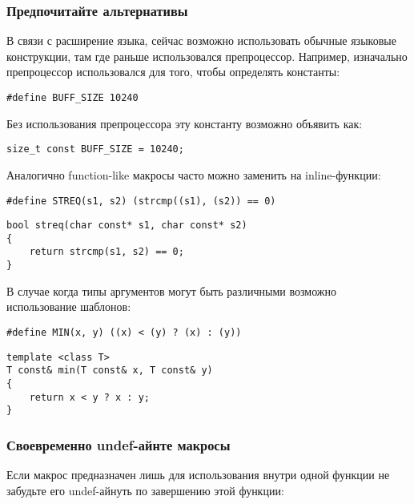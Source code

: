 \subsubsection{Предпочитайте альтернативы}

В связи с расширение языка, сейчас возможно использовать обычные языковые конструкции, там где раньше использовался препроцессор. Например, изначально препроцессор использовался для того, чтобы определять константы:

\begin{verbatim}
#define BUFF_SIZE 10240
\end{verbatim}

Без использования препроцессора эту константу возможно объявить как:
\begin{verbatim}
size_t const BUFF_SIZE = 10240;
\end{verbatim}

Аналогично function-like макросы часто можно заменить на inline-функции:
\begin{verbatim}
#define STREQ(s1, s2) (strcmp((s1), (s2)) == 0)
\end{verbatim}
\begin{verbatim}
bool streq(char const* s1, char const* s2)
{
    return strcmp(s1, s2) == 0;
}
\end{verbatim}

В случае когда типы аргументов могут быть различными возможно использование шаблонов:
\begin{verbatim}
#define MIN(x, y) ((x) < (y) ? (x) : (y))
\end{verbatim}
\begin{verbatim}
template <class T>
T const& min(T const& x, T const& y)
{
    return x < y ? x : y;
}
\end{verbatim}

\subsubsection{Своевременно undef-айнте макросы}

Если макрос предназначен лишь для использования внутри одной функции не забудьте его undef-айнуть по завершению этой функции:

